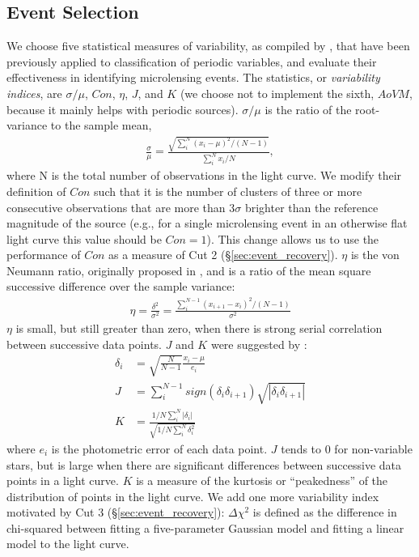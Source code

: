 \documentclass[12pt,preprint]{aastex}
\begin{document}
\subsection{Event Selection} \label{sec:event_selection}
We choose five statistical measures of variability, as compiled by \cite{shin2009}, that have been previously applied to classification of periodic variables, and evaluate their effectiveness in identifying microlensing events. The statistics, or \emph{variability indices}, are $\sigma/\mu$, $Con$, $\eta$, $J$, and $K$ (we choose not to implement the sixth, $AoVM$, because it mainly helps with periodic sources). $\sigma/\mu$ is the ratio of the root-variance to the sample mean, 
\begin{align}
	\frac{\sigma}{\mu} = \frac{\sqrt{\sum^N_i (x_i - \mu)^2 / (N-1)}}{\sum^N_i x_i/N},
\end{align}
where N is the total number of observations in the light curve. We modify their definition of $Con$ such that it is the number of clusters of three or more consecutive observations that are more than $3\sigma$ brighter than the reference magnitude of the source (e.g., for a single microlensing event in an otherwise flat light curve this value should be $Con=1$). This change allows us to use the performance of $Con$ as a measure of Cut 2 (\S\ref{sec:event_recovery}). $\eta$ is the von Neumann ratio, originally proposed in \cite{von_neumann1941}, and is a ratio of the mean square successive difference over the sample variance:
\begin{align}
	\eta = \frac{\delta^2}{\sigma^2} = \frac{\sum^{N-1}_i(x_{i+1} - x_i)^2/(N-1)}{\sigma^2}
\end{align}
$\eta$ is small, but still greater than zero, when there is strong serial correlation between successive data points. $J$ and $K$ were suggested by \cite{stetson1996}:
\begin{align}
	\delta_i &= \sqrt{\frac{N}{N-1}}\frac{x_i-\mu}{e_i}\\
	J &= \sum^{N-1}_i sign(\delta_i \delta_{i+1})\sqrt{|\delta_i \delta_{i+1}|}\\
	K &= \frac{1/N\sum^N_i |\delta_i|}{\sqrt{1/N\sum^N_i\delta_i^2}}
\end{align}
where $e_i$ is the photometric error of each data point. $J$ tends to 0 for non-variable stars, but is large when there are significant differences between successive data points in a light curve. $K$ is a measure of the kurtosis or ``peakedness'' of the distribution of points in the light curve. We add one more variability index motivated by Cut 3 (\S\ref{sec:event_recovery}): $\Delta \chi^2$ is defined as the difference in chi-squared between fitting a five-parameter Gaussian model and fitting a linear model to the light curve.
\end{document}
